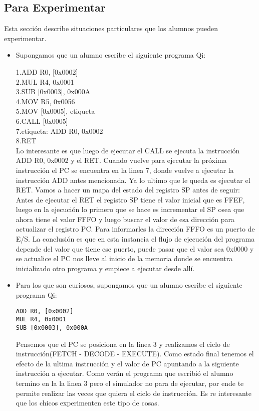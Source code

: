 \subsection{Para Experimentar}

Esta sección describe situaciones particulares que los alumnos pueden experimentar.

\begin{itemize}

\item Supongamos que un alumno escribe el siguiente programa Qi:

1.ADD R0, [0x0002]\\
2.MUL R4, 0x0001 \\
3.SUB [0x0003], 0x000A \\
4.MOV R5, 0x0056 \\
5.MOV [0x0005], etiqueta \\
6.CALL [0x0005] \\
7.etiqueta: ADD R0, 0x0002 \\
8.RET \\

Lo interesante es que luego de ejecutar el CALL se ejecuta la instrucción ADD R0, 0x0002 y el RET. Cuando vuelve para ejecutar la próxima instrucción el PC se encuentra en la linea 7, donde vuelve a ejecutar la instrucción ADD antes mencionada. Ya lo ultimo que le queda es ejecutar el RET.
Vamos a hacer un mapa del estado del registro SP antes de seguir: Antes de ejecutar el RET  el registro SP tiene el valor inicial que es FFEF, luego en la ejecución lo primero que se hace es incrementar el SP osea que ahora tiene el valor FFFO y luego buscar el valor de esa dirección para actualizar el registro PC. Para informarles la dirección FFFO es un puerto de E/S. La conclusión es que en esta instancia el flujo de ejecución del programa depende del valor que tiene ese puerto, puede pasar que el valor sea 0x0000 y se actualice el PC nos lleve al inicio de la memoria donde se encuentra inicializado otro programa y empiece a ejecutar desde allí. 


\item Para los que son curiosos, supongamos que un alumno escribe el siguiente programa Qi:
\begin{verbatim}
ADD R0, [0x0002]
MUL R4, 0x0001
SUB [0x0003], 0x000A 
\end{verbatim}

Pensemos que el PC se posiciona en la linea 3 y realizamos el ciclo de instrucción(FETCH - DECODE - EXECUTE). Como estado final tenemos el efecto de la ultima instrucción y el valor de PC apuntando a la siguiente instrucción a ejecutar. Como verán el programa que escribió el alumno termino en la la linea 3 pero el simulador no para de ejecutar, por ende te permite realizar las veces que quiera el ciclo de instrucción. Es re interesante que los chicos experimenten este tipo de cosas.

\end{itemize} 

